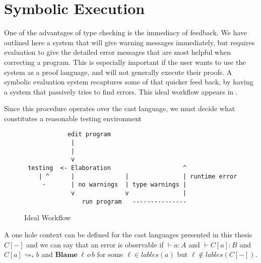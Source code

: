\section{Symbolic Execution}

One of the advantages of type checking is the immediacy of feedback.
We have outlined here a system that will give warning messages immediately, but requires evaluation to give the detailed error messages that are most helpful when correcting a program.
This is especially important if the user wants to use the system as a proof language, and will not generally execute their proofs.
A symbolic evaluation system recaptures some of that quicker feed back, by having a system that passively tries to find errors.
This ideal workflow appears in .

Since this procedure operates over the cast language, we must decide what constitutes a reasonable testing environment

\begin{figure}
\begin{lstlisting}
            edit program
             |      
             |      
             v
 testing  <- Elaboration                    ^
    | ^      |              |               | runtime error
     -       | no warnings  | type warnings |
             v              v               |
                run program   ---------------
\end{lstlisting}


\caption{Ideal Workflow}
\label{fig:notes-workflow}
\end{figure}

A one hole context can be defined for the cast languages presented in this thesis $C[-]$ and we can say that an error is observable if $\vdash a:A$ and $\vdash C[a]:B$ and $C[a]\rightsquigarrow_{*}b$ and $\textbf{Blame}\:\ell \,o\,b$ for some $\ell \in lables\left(a\right)$ but $\ell \notin lables\left(C[-]\right)$.


